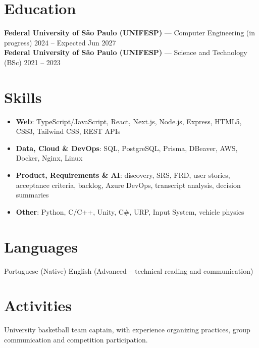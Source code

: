 \documentclass[a4paper,10pt]{article}
\begin{document}
\section*{Education}
\textbf{Federal University of São Paulo (UNIFESP)} --- Computer Engineering (in progress) \hfill 2024 -- Expected Jun 2027 \\
\textbf{Federal University of São Paulo (UNIFESP)} --- Science and Technology (BSc) \hfill 2021 -- 2023

\section*{Skills}
\begin{itemize}
    \item \textbf{Web}: TypeScript/JavaScript, React, Next.js, Node.js, Express, HTML5, CSS3, Tailwind CSS, REST APIs
    \item \textbf{Data, Cloud \& DevOps}: SQL, PostgreSQL, Prisma, DBeaver, AWS, Docker, Nginx, Linux
    \item \textbf{Product, Requirements \& AI}: discovery, SRS, FRD, user stories, acceptance criteria, backlog, Azure DevOps, transcript analysis, decision summaries
    \item \textbf{Other}: Python, C/C++, Unity, C\#, URP, Input System, vehicle physics
\end{itemize}

\section*{Languages}
Portuguese (Native) \textbar{} English (Advanced -- technical reading and communication)

\section*{Activities}
University basketball team captain, with experience organizing practices, group communication and competition participation.
\end{document}
